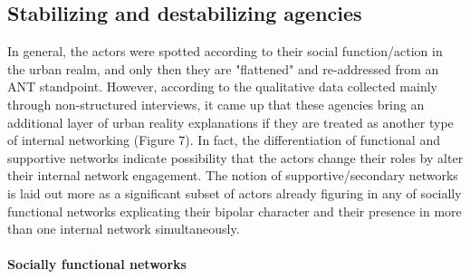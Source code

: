 \documentclass[11pt]{report}
\begin{document}
\subsection{Stabilizing and destabilizing agencies}

In general, the actors were spotted according to their social function/action in the urban realm, and only then they are "flattened" and re-addressed from an ANT standpoint. However,  according to the qualitative data collected mainly through non-structured interviews, it came up that these agencies bring an additional layer of urban reality explanations if they are treated as another type of internal networking (Figure 7).
In fact, the differentiation of functional and supportive networks indicate possibility that the actors change their roles by alter their internal network engagement. The notion of supportive/secondary networks is laid out more as a significant subset of actors already figuring in any of socially functional networks explicating their bipolar character and their presence in more than one internal network simultaneously. 

\paragraph{Socially functional networks}
\end{document}
